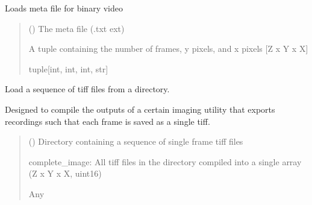 \documentclass[letterpaper,10pt,english]{sphinxmanual}
\begin{document}

\begin{fulllineitems}
\label{\detokenize{IO:IO.load_binary_meta}}
\pysigstartsignatures
{}
\pysigstopsignatures
\sphinxAtStartPar
Loads meta file for binary video
\begin{quote}\begin{description}
\sphinxAtStartPar
{} () \textendash{} The meta file (.txt ext)

\sphinxAtStartPar
A tuple containing the number of frames, y pixels, and x pixels {[}Z x Y x X{]}

\sphinxAtStartPar
tuple{[}int, int, int, str{]}

\end{description}\end{quote}

\end{fulllineitems}


\begin{fulllineitems}
\label{\detokenize{IO:IO.load_bruker_tiffs}}
\pysigstartsignatures
{}
\pysigstopsignatures
\sphinxAtStartPar
Load a sequence of tiff files from a directory.

\sphinxAtStartPar
Designed to compile the outputs of a certain imaging utility
that exports recordings such that each frame is saved as a single tiff.
\begin{quote}\begin{description}
\sphinxAtStartPar
{} () \textendash{} Directory containing a sequence of single frame tiff files

\sphinxAtStartPar
complete\_image:  All tiff files in the directory compiled into a single array (Z x Y x X, uint16)

\sphinxAtStartPar
Any

\end{description}\end{quote}

\end{fulllineitems}
\end{document}
